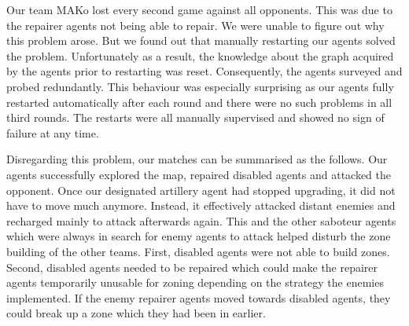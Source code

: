Our team MAKo lost every second game against all opponents.
This was due to the repairer agents not being able to repair.
We were unable to figure out why this problem arose.
But we found out that manually restarting our agents solved the problem.
Unfortunately as a result, the knowledge about the graph acquired by the agents prior to restarting was reset.
Consequently, the agents surveyed and probed redundantly.
This behaviour was especially surprising as our agents fully restarted automatically after each round and there were no such problems in all third rounds.
The restarts were all manually supervised and showed no sign of failure at any time.

Disregarding this problem, our matches can be summarised as the follows.
Our agents successfully explored the map, repaired disabled agents and attacked the opponent.
Once our designated artillery agent had stopped upgrading, it did not have to move much anymore.
Instead, it effectively attacked distant enemies and recharged mainly to attack afterwards again.
This and the other saboteur agents which were always in search for enemy agents to attack helped disturb the zone building of the other teams.
First, disabled agents were not able to build zones.
Second, disabled agents needed to be repaired which could make the repairer agents temporarily unusable for zoning depending on the strategy the enemies implemented.
If the enemy repairer agents moved towards disabled agents, they could break up a zone which they had been in earlier.


